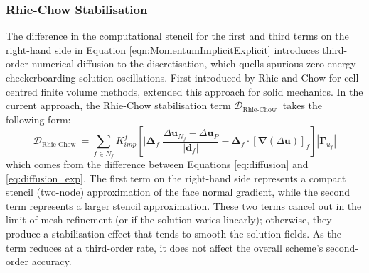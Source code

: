 \documentclass[sn-mathphys,Numbered]{sn-jnl}%
\newcommand{\bb}{\boldsymbol}
\begin{document}
\subsubsection{Rhie-Chow Stabilisation} \label{sec:RhieChowStab}
The difference in the computational stencil for the first and third terms on the right-hand side in Equation \ref{eqn:MomentumImplicitExplicit} introduces third-order numerical diffusion to the discretisation, which quells spurious zero-energy checkerboarding solution oscillations.
First introduced by Rhie and Chow \cite{rhie_numerical_1983} for cell-centred finite volume methods, \citet{demirdzic_numerical_1995} extended this approach for solid mechanics.
In the current approach, the Rhie-Chow stabilisation term $\mathcal{D}_{\text {Rhie-Chow }}$ takes the following form:
\begin{equation} \label{eq:RhieChow}
	\mathcal{D}_{\text {Rhie-Chow }}
	= \sum_{f \in N_f} K_{imp}^f
	\left[
	\left|\boldsymbol{\Delta}_f\right| \frac{\Delta \boldsymbol{u}_{N_f} - \Delta \boldsymbol{u}_P}{\left|\boldsymbol{d}_f\right|}
	- \boldsymbol{\Delta}_f \cdot\left[\boldsymbol{\nabla} (\Delta  \boldsymbol{u}) \right]_f
	\right]
	\left|\bb{\Gamma}_{u_f}\right| 
\end{equation}
which comes from the difference between Equations \ref{eq:diffusion} and \ref{eq:diffusion_exp}.
The first term on the right-hand side represents a compact stencil (two-node) approximation of the face normal gradient, while the second term represents a larger stencil approximation.
These two terms cancel out in the limit of mesh refinement (or if the solution varies linearly); otherwise, they produce a stabilisation effect that tends to smooth the solution fields.
As the term reduces at a third-order rate, it does not affect the overall scheme's second-order accuracy.
\end{document}
